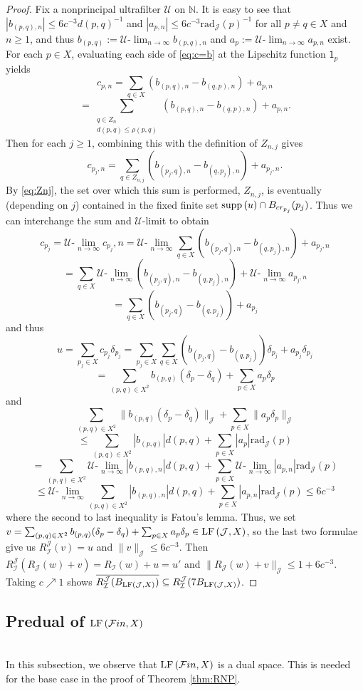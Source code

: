 \documentclass[12pt]{amsart}
\theoremstyle{definition}
\numberwithin{equation}{section}
\def \F {\mathcal{F}in}
\def \U {\mathcal{U}}
\def \N {\mathbb{N}}
\def \I {\mathcal{I}}
\def \J {\mathcal{J}}
\def \sbs {\subseteq}
\def \closure {\overline}
\def \one {\mathsf{1}}
\def \ulim {\mathcal{U}\text{-}\lim}
\newcommand{\rad}[2]{\mathrm{rad}_{#1}\left(#2\right)}
\begin{document}
\begin{proof}
Fix a nonprincipal ultrafilter $\U$ on $\N$. It is easy to see that $|b_{(p,q),n}| \leq 6c^{-3}d(p,q)^{-1}$ and $|a_{p,n}| \leq 6c^{-3}\rad{\J}{p}^{-1}$ for all $p\neq q \in X$ and $n \geq 1$, and thus $b_{(p,q)} := \ulim_{n \to \infty} b_{(p,q),n}$ and $a_p := \ulim_{n \to \infty} a_{p,n}$ exist.
For each $p \in X$, evaluating each side of \eqref{eq:c=b} at the Lipschitz function $\one_p$ yields
$$c_{p,n} = \sum_{q \in X} (b_{(p,q),n}-b_{(q,p),n}) + a_{p,n}$$
$$=\sum_{\substack{q \in Z_n \\ d(p,q) \leq \rho(p,q)}} (b_{(p,q),n}-b_{(q,p),n}) + a_{p,n}.$$
Then for each $j \geq 1$, combining this with the definition of $Z_{n,j}$ gives
$$c_{p_j,n} = \sum_{q \in Z_{n,j}} (b_{(p_j,q),n}-b_{(q,p_j),n}) + a_{p_j,n}.$$
By \eqref{eq:Znj}, the set over which this sum is performed, $Z_{n,j}$, is eventually (depending on $j$) contained in the fixed finite set $\supp{u} \cap B_{cr_{p_j}}(p_j)$. Thus we can interchange the sum and $\U$-limit to obtain
$$c_{p_j} = \ulim_{n \to \infty} c_{p_j},n = \ulim_{n \to \infty} \sum_{q \in X} (b_{(p_j,q),n}-b_{(q,p_j),n}) + a_{p_j,n}$$
$$= \sum_{q \in X} \ulim_{n \to \infty} (b_{(p_j,q),n}-b_{(q,p_j),n}) + \ulim_{n \to \infty} a_{p_j,n}$$
$$= \sum_{q \in X} (b_{(p_j,q)}-b_{(q,p_j)}) + a_{p_j}$$
and thus
$$u = \sum_{p_j \in X} c_{p_j}\delta_{p_j} = \sum_{p_j \in X} \sum_{q \in X}(b_{(p_j,q)}-b_{(q,p_j)})\delta_{p_j} + a_{p_j}\delta_{p_j}$$
$$= \sum_{(p,q) \in X^2}b_{(p,q)}(\delta_p-\delta_q) + \sum_{p \in X} a_p \delta_p$$
and
$$\sum_{(p,q) \in X^2} \|b_{(p,q)}(\delta_p-\delta_q)\|_\J + \sum_{p \in X} \|a_{p} \delta_p\|_\J$$
$$\leq \sum_{(p,q) \in X^2}|b_{(p,q)}|d(p,q) + \sum_{p \in X} |a_{p}|\rad{\J}{p}$$
$$= \sum_{(p,q) \in X^2}\ulim_{n \to \infty}|b_{(p,q),n}|d(p,q) + \sum_{p \in X} \ulim_{n \to \infty}|a_{p,n}|\rad{\J}{p}$$
$$\leq \ulim_{n \to \infty} \sum_{(p,q) \in X^2}|b_{(p,q),n}|d(p,q) + \sum_{p \in X}|a_{p,n}|\rad{\J}{p} \leq 6c^{-3}$$
where the second to last inequality is Fatou's lemma. Thus, we set $v = \sum_{(p,q) \in X^2}b_{(p,q)}(\delta_p-\delta_q) + \sum_{p \in X} a_{p} \delta_p \in \LF{\J}{X}$, so the last two formulae give us $R^\J_\I(v) = u$ and $\|v\|_\J \leq 6c^{-3}$. Then $R^\J_\I(R_\J(w)+v) = R_\I(w) + u = u'$ and $\|R_\J(w)+v\|_\J \leq 1 + 6c^{-3}$. Taking $c \nearrow 1$ shows $\closure{R^\J_\I(B_{\LF{\J}{X}})} \sbs R^\J_\I(7B_{\LF{\J}{X}})$.
\end{proof}

\subsection{Predual of $\LF{\F}{X}$} \label{ss:predual} ~\\
\indent In this subsection, we observe that $\LF{\F}{X}$ is a dual space. This is needed for the base case in the proof of Theorem \ref{thm:RNP}.
\end{document}
